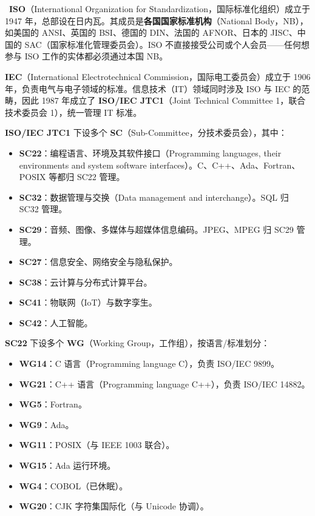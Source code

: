 \documentclass[12pt,a4paper,fontset=fandol]{ctexbook}
\newcommand{\govlabel}{%
  \tcbox[on line,colback=govheadbg,colframe=govheadbg,
    boxrule=0pt,arc=1pt,left=2pt,right=2pt,top=1pt,bottom=1pt,
    colupper=white,fontupper=\scriptsize\bfseries]{治理}}
\begin{document}
\govlabel\ \textbf{ISO}（International Organization for Standardization，国际标准化组织）成立于 1947 年，总部设在日内瓦。其成员是\textbf{各国国家标准机构}（National Body，NB），如美国的 ANSI、英国的 BSI、德国的 DIN、法国的 AFNOR、日本的 JISC、中国的 SAC（国家标准化管理委员会）。ISO 不直接接受公司或个人会员——任何想参与 ISO 工作的实体都必须通过本国 NB。

\textbf{IEC}（International Electrotechnical Commission，国际电工委员会）成立于 1906 年，负责电气与电子领域的标准。信息技术（IT）领域同时涉及 ISO 与 IEC 的范畴，因此 1987 年成立了 \textbf{ISO/IEC JTC1}（Joint Technical Committee 1，联合技术委员会 1），统一管理 IT 标准。

\textbf{ISO/IEC JTC1} 下设多个 \textbf{SC}（Sub-Committee，分技术委员会），其中：

\begin{itemize}
  \item \textbf{SC22}：编程语言、环境及其软件接口（Programming languages, their environments and system software interfaces）。C、C++、Ada、Fortran、POSIX 等都归 SC22 管理。
  \item \textbf{SC32}：数据管理与交换（Data management and interchange）。SQL 归 SC32 管理。
  \item \textbf{SC29}：音频、图像、多媒体与超媒体信息编码。JPEG、MPEG 归 SC29 管理。
  \item \textbf{SC27}：信息安全、网络安全与隐私保护。
  \item \textbf{SC38}：云计算与分布式计算平台。
  \item \textbf{SC41}：物联网（IoT）与数字孪生。
  \item \textbf{SC42}：人工智能。
\end{itemize}

\textbf{SC22} 下设多个 \textbf{WG}（Working Group，工作组），按语言/标准划分：

\begin{itemize}
  \item \textbf{WG14}：C 语言（Programming language C），负责 ISO/IEC 9899。
  \item \textbf{WG21}：C++ 语言（Programming language C++），负责 ISO/IEC 14882。
  \item \textbf{WG5}：Fortran。
  \item \textbf{WG9}：Ada。
  \item \textbf{WG11}：POSIX（与 IEEE 1003 联合）。
  \item \textbf{WG15}：Ada 运行环境。
  \item \textbf{WG4}：COBOL（已休眠）。
  \item \textbf{WG20}：CJK 字符集国际化（与 Unicode 协调）。
\end{itemize}
\end{document}
